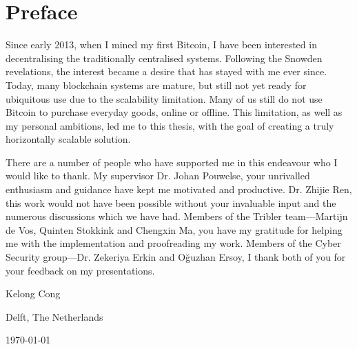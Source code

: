 \chapter*{Preface}
Since early 2013, when I mined my first Bitcoin, 
I have been interested in decentralising the traditionally centralised systems.
Following the Snowden revelations, the interest became a desire that has stayed with me ever since.
Today, many blockchain systems are mature, but still not yet ready for ubiquitous use due to the scalability limitation.
Many of us still do not use Bitcoin to purchase everyday goods, online or offline.
This limitation, as well as my personal ambitions, led me to this thesis,
with the goal of creating a truly horizontally scalable solution.

\vspace{1\baselineskip}

\noindent
There are a number of people who have supported me in this endeavour who I would like to thank.
My supervisor Dr. Johan Pouwelse, your unrivalled enthusiasm and guidance have kept me motivated and productive.
Dr. Zhijie Ren, this work would not have been possible without your invaluable input and the numerous discussions which we have had.
Members of the Tribler team---Martijn de Vos, Quinten Stokkink and Chengxin Ma,
you have my gratitude for helping me with the implementation and proofreading my work.
Members of the Cyber Security group---Dr. Zekeriya Erkin and O\u{g}uzhan Ersoy,
I thank both of you for your feedback on my presentations.

\vspace{1\baselineskip}

\noindent
Kelong Cong

\vspace{1\baselineskip}

\noindent
Delft, The Netherlands

\noindent
\today
